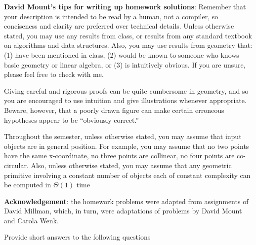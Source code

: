 \documentclass{article}
\begin{document}
{\bf David Mount's tips for writing up homework solutions}:
Remember that your description is intended to be read by a
human, not a compiler, so conciseness and clarity are preferred over technical
details.  Unless otherwise stated, you may use any results from class, or
results from any standard textbook on algorithms and data structures. Also, you
may use results from geometry that: (1) have been mentioned in class, (2) would
be known to someone who knows basic geometry or linear algebra, or (3) is
intuitively obvious. If you are unsure, please feel free to check with me.

Giving careful and rigorous proofs can be quite cumbersome in geometry, and so
you are encouraged to use intuition and give illustrations whenever appropriate.
Beware, however, that a poorly drawn figure can make certain erroneous
hypotheses appear to be ``obviously correct.''

Throughout the semester, unless otherwise stated, you may assume that input
objects are in general position. For example, you may assume that no two points
have the same x-coordinate, no three points are collinear, no four points are
co-circular. Also, unless otherwise stated, you may assume that any geometric
primitive involving a constant number of objects each of constant complexity can
be computed in $\Theta(1)$ time


{\bf Acknowledgement}: the homework problems were adapted from assignments of David
Millman, which, in turn, were adaptations of problems by David Mount and Carola
Wenk.

\collab{\todo{}}

Provide short answers to the following questions
\end{document}
